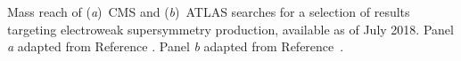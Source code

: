 
Mass reach of (\textit{a})\ CMS and (\textit{b})\ ATLAS searches for a selection of
results targeting electroweak supersymmetry production, available as of July 2018.
Panel \textit{a} adapted from Reference . 
Panel \textit{b} adapted from Reference~.

